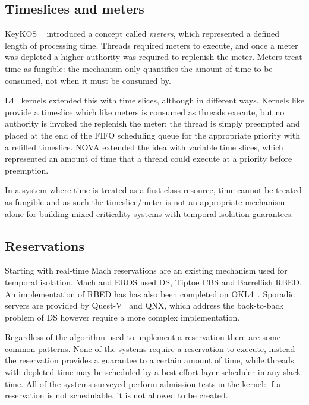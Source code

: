 \subsection{Timeslices and meters}

KeyKOS ~\citep{Bomberger_FFHLS_92} introduced a concept called \emph{meters}, which represented a
defined length of processing time. Threads required meters to execute, and once a meter was depleted
a higher authority was required to replenish the meter. Meters treat time as fungible: the mechanism
only quantifies the amount of time to be consumed, not when it must be consumed by.

L4~\citep{Elphinstone_Heiser_13} kernels extended this with time slices, although in different ways.
Kernels like \selfour provide a timeslice which like meters is consumed as threads execute, but no
authority is invoked the replenish the meter: the thread is simply preempted and placed at the end of
the \gls{FIFO} scheduling queue for the appropriate priority with a refilled timeslice. NOVA
extended the idea with variable time slices, which represented an amount of time that a thread could
execute at a priority before preemption.

In a system where time is treated as a first-class resource, time cannot be treated as fungible and
as such the timeslice/meter is not an appropriate mechanism alone for building mixed-criticality
systems with temporal isolation guarantees.

\subsection{Reservations}

Starting with real-time Mach reservations are an existing mechanism used for temporal isolation.
Mach and EROS used \gls{DS}, Tiptoe \gls{CBS} and Barrelfish \gls{RBED}. 
An implementation of RBED has has also been completed on OKL4~\citep{Petters_LHE_09}.
Sporadic servers are provided by Quest-V~\citep{Li_WCM_14} and QNX, which address the back-to-back
problem of \gls{DS} however require a more complex implementation.

Regardless of the algorithm used to implement a reservation there are some common patterns.  None of
the systems require a reservation to execute, instead the reservation provides a guarantee to a
certain amount of time, while threads with depleted time may be scheduled by a best-effort layer
scheduler in any slack time. All of the systems surveyed perform admission tests in the kernel: if a
reservation is not schedulable, it is not allowed to be created. 

